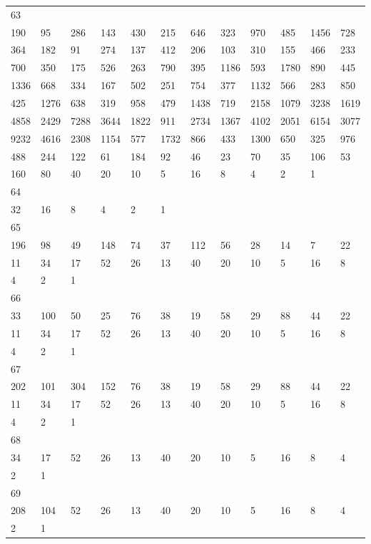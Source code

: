 \begin{longtable}{llllllllllll}
63&&&&&&&&&&&\\
190& 95& 286& 143& 430& 215& 646& 323& 970& 485& 1456& 728\\
364& 182& 91& 274& 137& 412& 206& 103& 310& 155& 466& 233\\
700& 350& 175& 526& 263& 790& 395& 1186& 593& 1780& 890& 445\\
1336& 668& 334& 167& 502& 251& 754& 377& 1132& 566& 283& 850\\
425& 1276& 638& 319& 958& 479& 1438& 719& 2158& 1079& 3238& 1619\\
4858& 2429& 7288& 3644& 1822& 911& 2734& 1367& 4102& 2051& 6154& 3077\\
9232& 4616& 2308& 1154& 577& 1732& 866& 433& 1300& 650& 325& 976\\
488& 244& 122& 61& 184& 92& 46& 23& 70& 35& 106& 53\\
160& 80& 40& 20& 10& 5& 16& 8& 4& 2& 1& \\

64&&&&&&&&&&&\\
32& 16& 8& 4& 2& 1& \\

65&&&&&&&&&&&\\
196& 98& 49& 148& 74& 37& 112& 56& 28& 14& 7& 22\\
11& 34& 17& 52& 26& 13& 40& 20& 10& 5& 16& 8\\
4& 2& 1& \\

66&&&&&&&&&&&\\
33& 100& 50& 25& 76& 38& 19& 58& 29& 88& 44& 22\\
11& 34& 17& 52& 26& 13& 40& 20& 10& 5& 16& 8\\
4& 2& 1& \\

67&&&&&&&&&&&\\
202& 101& 304& 152& 76& 38& 19& 58& 29& 88& 44& 22\\
11& 34& 17& 52& 26& 13& 40& 20& 10& 5& 16& 8\\
4& 2& 1& \\

68&&&&&&&&&&&\\
34& 17& 52& 26& 13& 40& 20& 10& 5& 16& 8& 4\\
2& 1& \\

69&&&&&&&&&&&\\
208& 104& 52& 26& 13& 40& 20& 10& 5& 16& 8& 4\\
2& 1& \\


\end{longtable}

